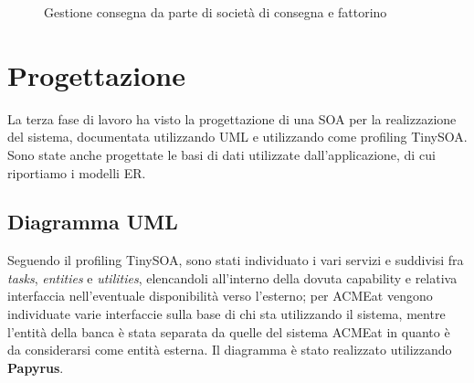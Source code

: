 \documentclass[11pt]{article} %
\begin{document}
\begin{figure}[p]
\begin{center}
\caption{Gestione consegna da parte di società di consegna e fattorino}
\end{center}
\end{figure}

\clearpage

\section{Progettazione}
\label{sez:progettazione}

La terza fase di lavoro ha visto la progettazione di una SOA per la realizzazione del sistema, documentata utilizzando UML e utilizzando come profiling TinySOA. Sono state anche progettate le basi di dati utilizzate dall'applicazione, di cui riportiamo i modelli ER.

\subsection{Diagramma UML}

Seguendo il profiling TinySOA, sono stati individuato i vari servizi e suddivisi fra \emph{tasks}, \emph{entities} e \emph{utilities}, elencandoli all'interno della dovuta capability e relativa interfaccia nell'eventuale disponibilità verso l'esterno; per ACMEat vengono individuate varie interfaccie sulla base di chi sta utilizzando il sistema, mentre l'entità della banca è stata separata da quelle del sistema ACMEat in quanto è da considerarsi come entità esterna. Il diagramma è stato realizzato utilizzando \textbf{Papyrus}.
\end{document}
